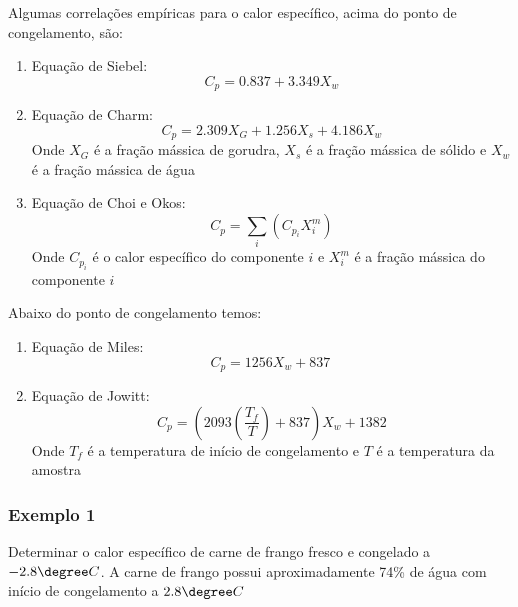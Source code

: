 Algumas correlações empíricas para o calor específico, acima do ponto de congelamento, são:
\begin{enumerate}
    \item {Equação de Siebel:
        \begin{equation}\label{eq:siebel}
            C_{p}  = 0.837 + 3.349X_{w} 
        \end{equation}}
    \item {Equação de Charm:
        \begin{equation}\label{eq:charm}
            C_{p}  = 2.309X_{G} + 1.256X_{s} + 4.186X_{w}
        \end{equation}
        Onde \(X_G\) é a fração mássica de gorudra, \(X_s\) é a fração mássica de sólido e \(X_w\) é a
        fração mássica de água}
        \item {Equação de Choi e Okos:
                \begin{equation}
                    C_{p}  = \sum_{i} \left( C_{p_{i}} X_i^{m}  \right)  
                \end{equation}
                Onde \(C_{p_{i}}\) é o calor específico do componente \(i\) e \(X_i^{m}\) é a fração
                mássica do componente \(i\)}
\end{enumerate}
Abaixo do ponto de congelamento temos:
\begin{enumerate}
    \item {Equação de Miles:
        \begin{equation}\label{eq:miles}
            C_{p}  = 1256X_{w} + 837\
        \end{equation}}
    \item {Equação de Jowitt:
        \begin{equation}\label{eq:jowitt_cp}
            C_{p}  = \left( 2093 \left( \frac{T_{f} }{T} \right) + 837 \right) X_{w} + 1382
        \end{equation}
        Onde \(T_{f} \) é a temperatura de início de congelamento e \(T\) é a temperatura da
        amostra}
\end{enumerate}
\subsubsection{Exemplo 1}
Determinar o calor específico de carne de frango fresco e congelado a \(-2.8 \degree C\). A carne de
frango possui aproximadamente 74\% de água com início de congelamento a \(2.8 \degree C\)
